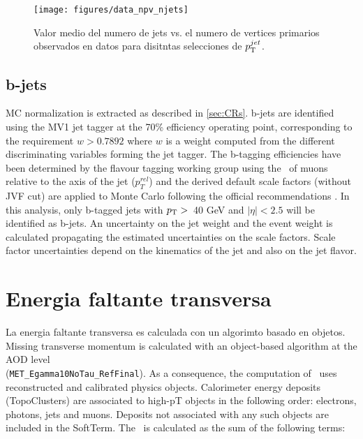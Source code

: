 \begin{figure}[ht!]
  \centering
  \texttt{[image: figures/data\_npv\_njets]}
  \caption{Valor medio del numero de jets vs. el numero de vertices primarios
    observados en datos para disitntas selecciones de $p_{\mathrm{T}}^{jet}$.}
    \label{fig:NjetvsPV}
\end{figure}


\subsection{b-jets}
\label{sec:bjet_obj}

MC normalization is extracted as described in \Sec \ref{sec:CRs}. b-jets are identified using
the MV1 jet tagger \cite{ATLAS-CONF-2012-043} at the 70\% efficiency operating point, corresponding
to the requirement $w > 0.7892$ where $w$ is a weight computed from the different discriminating
variables forming the jet tagger. The b-tagging efficiencies have been determined by the flavour
tagging working group using the \pt\ of muons relative to the axis of the jet ($p_{T}^{rel}$) \cite{ATLAS-CONF-2012-043} and the
derived default scale factors (without JVF cut) are applied to Monte Carlo following the official recommendations \cite{bjetsCalib}.
In this analysis, only b-tagged jets with $p_{\mathrm{T}} >$~40 GeV and $|\eta| < 2.5$ will be identified as b-jets.
An uncertainty on the jet weight and the event weight is calculated propagating the estimated uncertainties
on the scale factors. Scale factor uncertainties depend on the kinematics of the jet and also on the jet flavor.

\section{Energia faltante transversa}
\label{sec:met_obj}

La energia faltante transversa es calculada con un algorimto basado en objetos.
Missing transverse momentum is calculated with an object-based algorithm at the AOD level
\\ (\texttt{MET\_Egamma10NoTau\_RefFinal}). As a consequence, the computation of \met\ uses reconstructed and calibrated physics objects. Calorimeter energy
deposits (TopoClusters) are associated to high-pT objects in the following order: electrons, photons, jets and muons. Deposits not associated
with any such objects are included in the SoftTerm. The \met\ is calculated as the sum of the following terms:

